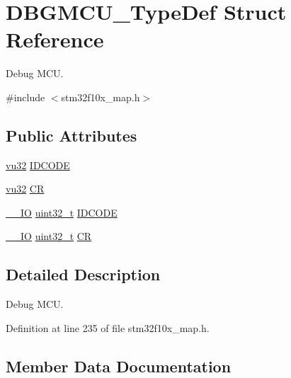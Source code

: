 \hypertarget{struct_d_b_g_m_c_u___type_def}{}\section{D\+B\+G\+M\+C\+U\+\_\+\+Type\+Def Struct Reference}
\label{struct_d_b_g_m_c_u___type_def}


Debug M\+CU.  




{\ttfamily \#include $<$stm32f10x\+\_\+map.\+h$>$}

\subsection*{Public Attributes}
\begin{DoxyCompactItemize}
\item 
\hyperlink{agilefox_2library_2inc_2stm32f10x__type_8h_a6e2761f0a1011f84ed96b946f2c8a563}{vu32} \hyperlink{struct_d_b_g_m_c_u___type_def_a1c549eb335812a48ba332c22d14ade1d}{I\+D\+C\+O\+DE}
\item 
\hyperlink{agilefox_2library_2inc_2stm32f10x__type_8h_a6e2761f0a1011f84ed96b946f2c8a563}{vu32} \hyperlink{struct_d_b_g_m_c_u___type_def_af23701ed2c105fbafa2d8aa80c7106b7}{CR}
\item 
\hyperlink{group___c_m_s_i_s___c_m3__core__definitions_gaec43007d9998a0a0e01faede4133d6be}{\+\_\+\+\_\+\+IO} \hyperlink{_p_e___types_8h_a33594304e786b158f3fb30289278f5af}{uint32\+\_\+t} \hyperlink{struct_d_b_g_m_c_u___type_def_a0cc3561c124d06bb57dfa855e43ed99f}{I\+D\+C\+O\+DE}
\item 
\hyperlink{group___c_m_s_i_s___c_m3__core__definitions_gaec43007d9998a0a0e01faede4133d6be}{\+\_\+\+\_\+\+IO} \hyperlink{_p_e___types_8h_a33594304e786b158f3fb30289278f5af}{uint32\+\_\+t} \hyperlink{struct_d_b_g_m_c_u___type_def_a15981828f2b915d38570cf6684e99a53}{CR}
\end{DoxyCompactItemize}


\subsection{Detailed Description}
Debug M\+CU. 

Definition at line 235 of file stm32f10x\+\_\+map.\+h.



\subsection{Member Data Documentation}
